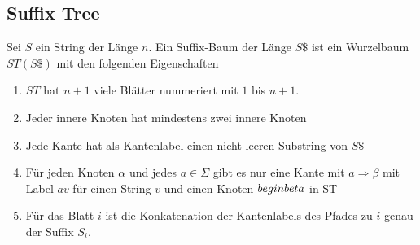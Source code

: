 \documentclass[a4paper, 12pt]{article}
\theoremstyle{plain}
\theoremstyle{definition}
\theoremstyle{lemma}
\theoremstyle{remark}
\theoremstyle{corollary}
\theoremstyle{example}
\begin{document}
	\subsection{Suffix Tree}
	Sei $S$ ein String der Länge $n$. Ein Suffix-Baum der Länge $S\$$ ist ein Wurzelbaum $ST(S\$)$ mit den folgenden Eigenschaften \begin{enumerate}
		\item $ST$ hat $n+1$ viele Blätter nummeriert mit $1$ bis $n+1$.
		\item Jeder innere Knoten hat mindestens zwei innere Knoten
		\item Jede Kante hat als Kantenlabel einen nicht leeren Substring von $S\$$
		\item Für jeden Knoten $\alpha$ und jedes $a \in \Sigma$ gibt es nur eine Kante mit $a\Rightarrow \beta$ mit Label $av$ für einen String $v$ und einen Knoten $\\begin
		beta$ in ST
		\item Für das Blatt $i$ ist die Konkatenation der Kantenlabels des Pfades zu $i$ genau der Suffix $S_i$.
	\end{enumerate}
\end{document}
